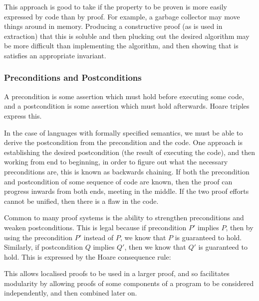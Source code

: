 This approach is good to take if the property to be proven is more
easily expressed by code than by proof. For example, a garbage
collector may move things around in memory. Producing a constructive
proof (as is used in extraction) that this is soluble and then
plucking out the desired algorithm may be more difficult than
implementing the algorithm, and then showing that is satisfies an
appropriate invariant.

\subsubsection{Preconditions and Postconditions}
\label{sec:lit-verification-embedding-conditions}

A precondition is some assertion which must hold before executing some
code, and a postcondition is some assertion which must hold
afterwards\cite{Hoare69}. Hoare triples express this.

In the case of languages with formally specified semantics, we must be
able to derive the postcondition from the precondition and the
code. One approach is establishing the desired postcondition (the
result of executing the code), and then working from end to beginning,
in order to figure out what the necessary preconditions are, this is
known as backwards chaining\cite{Russell05}. If both the precondition
and postcondition of some sequence of code are known, then the proof
can progress inwards from both ends, meeting in the middle. If the two
proof efforts cannot be unified, then there is a flaw in the code.

Common to many proof systems is the ability to strengthen
preconditions and weaken postconditions\cite{Hoare69}. This is legal
because if precondition $P'$ implies $P$, then by using the
precondition $P'$ instead of $P$, we know that $P$ is guaranteed to
hold. Similarly, if postcondition $Q$ implies $Q'$, then we know that
$Q'$ is guaranteed to hold. This is expressed by the Hoare consequence
rule:

\begin{prooftree}
\end{prooftree}

This allows localised proofs to be used in a larger proof, and so
facilitates modularity by allowing proofs of some components of a
program to be considered independently, and then combined later on.

